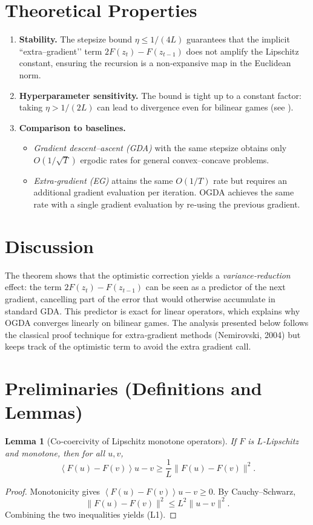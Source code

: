 \documentclass[11pt]{article}
\newtheorem{lemma}{Lemma}
\newcommand{\inner}[1]{\left\langle#1\right\rangle}
\begin{document}
\section*{Theoretical Properties}
\begin{enumerate}
\item \textbf{Stability.} The stepsize bound $\eta\le 1/(4L)$ guarantees that the implicit “extra–gradient’’ term $2F(z_t)-F(z_{t-1})$ does not amplify the Lipschitz constant, ensuring the recursion is a non‑expansive map in the Euclidean norm.
\item \textbf{Hyperparameter sensitivity.} The bound is tight up to a constant factor: taking $\eta>1/(2L)$ can lead to divergence even for bilinear games (see \cite{daskalakis2018training}).
\item \textbf{Comparison to baselines.}
    \begin{itemize}
        \item \emph{Gradient descent–ascent (GDA)} with the same stepsize obtains only $O(1/\sqrt{T})$ ergodic rates for general convex–concave problems.
        \item \emph{Extra‑gradient (EG)} attains the same $O(1/T)$ rate but requires an additional gradient evaluation per iteration. OGDA achieves the same rate with a single gradient evaluation by re‑using the previous gradient.
    \end{itemize}
\end{enumerate}

\section*{Discussion}
The theorem shows that the optimistic correction yields a \emph{variance‑reduction} effect: the term $2F(z_t)-F(z_{t-1})$ can be seen as a predictor of the next gradient, cancelling part of the error that would otherwise accumulate in standard GDA. This predictor is exact for linear operators, which explains why OGDA converges linearly on bilinear games. The analysis presented below follows the classical proof technique for extra‑gradient methods (Nemirovski, 2004) but keeps track of the optimistic term to avoid the extra gradient call.

\section*{Preliminaries (Definitions and Lemmas)}
\begin{lemma}[Co‑coercivity of Lipschitz monotone operators]\label{lem:coercive}
If $F$ is $L$‑Lipschitz and monotone, then for all $u,v$,
\[
\inner{F(u)-F(v)}{u-v}\ge\frac{1}{L}\|F(u)-F(v)\|^2.
\tag{L1}
\]
\end{lemma}
\begin{proof}
Monotonicity gives $\inner{F(u)-F(v)}{u-v}\ge0$. By Cauchy–Schwarz,
\[
\|F(u)-F(v)\|^2\le L^2\|u-v\|^2.
\]
Combining the two inequalities yields (L1). \qedhere
\end{proof}
\end{document}
